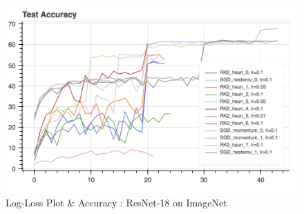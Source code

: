 \begin{figure}[htb]
\includegraphics[scale=0.5]{plots/imagenet_3.png}


\caption{Log-Loss Plot \& Accuracy : ResNet-18 on ImageNet}
\end{figure}




